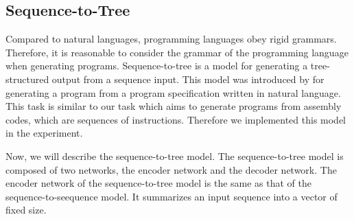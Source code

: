 \documentclass[senior,final,11pt]{iscs-thesis}
\begin{document}











\subsection{Sequence-to-Tree}
Compared to natural languages, programming languages obey rigid grammars. %
Therefore, it is reasonable to consider the grammar of the programming language when generating programs.
Sequence-to-tree is a model for generating a tree-structured output from a sequence input. 
This model was introduced by \citet{Seq2Tree} for generating a program from a program specification written in natural language. 
This task is similar to our task which aims to generate programs from assembly codes, which are sequences of instructions.
Therefore we implemented this model in the experiment.

Now, we will describe the sequence-to-tree model.
The sequence-to-tree model is composed of two networks, the encoder network and the decoder network.
The encoder network of the sequence-to-tree model is the same as that of the sequence-to-seequence model. 
It summarizes an input sequence into a vector of fixed size.
\end{document}
